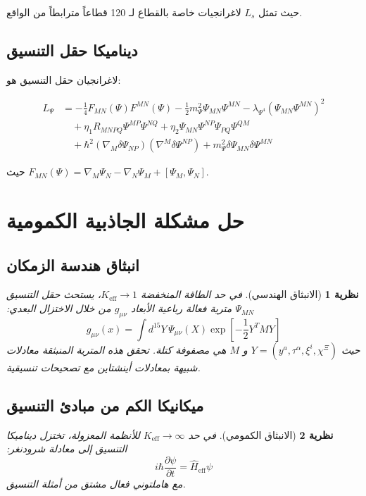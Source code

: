 \documentclass[11pt,a4paper]{article}
\newcommand{\eff}{\text{eff}}
\newtheorem{theorem}{نظرية}[section]
\theoremstyle{remark}
\newcommand{\Keff}{K_{\mathrm{eff}}}
\begin{document}
	حيث تمثل $L_s$ لاغرانجيات خاصة بالقطاع لـ 120 قطاعاً مترابطاً من الواقع.
	
	\subsection{ديناميكا حقل التنسيق}
	
	لاغرانجيان حقل التنسيق هو:
	
	\begin{equation}
		\begin{aligned}
			L_{\Psi} &= -\frac{1}{4} F_{MN}(\Psi) F^{MN}(\Psi)
			- \frac{1}{2} m_{\Psi}^2 \Psi_{MN} \Psi^{MN}
			- \lambda_{\Psi^4} (\Psi_{MN}\Psi^{MN})^2 \\
			&\quad + \eta_1 R_{MNPQ} \Psi^{MP} \Psi^{NQ}
			+ \eta_2 \Psi_{MN}\Psi^{NP}\Psi_{PQ}\Psi^{QM} \\
			&\quad + \hbar^2 (\nabla_M \delta\Psi_{NP})(\nabla^M \delta\Psi^{NP})
			+ m_{\Psi}^2 \delta\Psi_{MN}\delta\Psi^{MN}
		\end{aligned}
	\end{equation}
	
	حيث $F_{MN}(\Psi) = \nabla_M \Psi_N - \nabla_N \Psi_M + [\Psi_M, \Psi_N]$.
	
	\section{حل مشكلة الجاذبية الكمومية}
	\label{sec:quantum-gravity-resolution}
	
	\subsection{انبثاق هندسة الزمكان}
	
	\begin{theorem}[الانبثاق الهندسي]
		في حد الطاقة المنخفضة $\Keff \to 1$، يستحث حقل التنسيق $\Psi_{MN}$ مترية فعالة رباعية الأبعاد $g_{\mu\nu}$ من خلال الاختزال البعدي:
		\[
		g_{\mu\nu}(x) = \int d^{15}Y \, \Psi_{\mu\nu}(X) \exp\left[-\frac{1}{2}Y^T M Y\right]
		\]
		حيث $Y = (y^a, \tau^\alpha, \xi^i, \chi^\Xi)$ و $M$ هي مصفوفة كتلة. تحقق هذه المترية المنبثقة معادلات شبيهة بمعادلات أينشتاين مع تصحيحات تنسيقية.
	\end{theorem}
	
	\subsection{ميكانيكا الكم من مبادئ التنسيق}
	
	\begin{theorem}[الانبثاق الكمومي]
		في حد $\Keff \to \infty$ للأنظمة المعزولة، تختزل ديناميكا التنسيق إلى معادلة شرودنغر:
		\[
		i\hbar \frac{\partial \psi}{\partial t} = \hat{H}_{\eff} \psi
		\]
		مع هاملتوني فعال مشتق من أمثلة التنسيق.
	\end{theorem}
	
\end{document}

